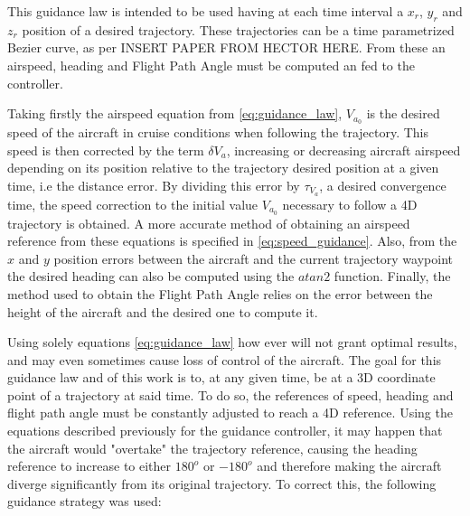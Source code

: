 This guidance law is intended to be used having at each time interval a $x_r$, $y_r$ and $z_r$ position of a desired trajectory. These trajectories can be a time parametrized Bezier curve, as per INSERT PAPER FROM HECTOR HERE. From these an airspeed, heading and Flight Path Angle must be computed an fed to the controller. 

Taking firstly the airspeed equation from \ref{eq:guidance_law}, $V_{a_0}$ is the desired speed of the aircraft in cruise conditions when following the trajectory. This speed is then corrected by the term $\delta V_a$, increasing or decreasing aircraft airspeed depending on its position relative to the trajectory desired position at a given time, i.e the distance error. By dividing this error by $\tau_{V_a}$, a desired convergence time, the speed correction to the initial value $V_{a_0}$ necessary to follow a 4D trajectory is obtained. A more accurate method of obtaining an airspeed reference from these equations is specified in \ref{eq:speed_guidance}. Also, from the $x$ and $y$ position errors between the aircraft and the current trajectory waypoint the desired heading can also be computed using the $atan2$ function. Finally, the method used to obtain the Flight Path Angle relies on the error between the height of the aircraft and the desired one to compute it. 


Using solely equations \ref{eq:guidance_law} how ever will not grant optimal results, and may even sometimes cause loss of control of the aircraft. The goal for this guidance law and of this work is to, at any given time, be at a 3D coordinate point of a trajectory at said time. To do so, the references of speed, heading and flight path angle must be constantly adjusted to reach a 4D reference. Using the equations described previously for the guidance controller, it may happen that the aircraft would "overtake" the trajectory reference, causing the heading reference to increase to either $180^o$ or $-180^o$ and therefore making the aircraft diverge significantly from its original trajectory. To correct this, the following guidance strategy was used:

